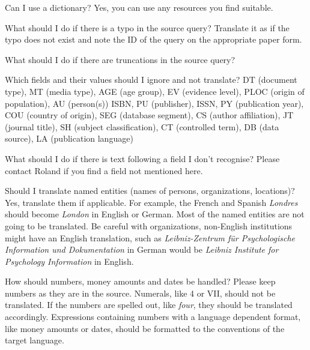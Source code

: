 \documentclass[a4paper,10pt]{article}
\newenvironment{faq}{\begin{description}[style=nextline]}{\end{description}}
\newcommand{\cris}[1]{{\color{red}{#1}}}
\begin{document}
\begin{faq}

  \item[Can I use a dictionary?]
 Yes, you can use any resources you find suitable.
  
  \item[What should I do if there is a typo in the source query?]
    Translate it as if the typo does not exist and note the ID of the query on the appropriate paper form.

  \item[What should I do if there are truncations in the source query?]
\cris{RR: No idea. Report it, so we can deal with this later?!}

    
  \item[Which fields and their values should I ignore and not translate?]
  DT (document type), MT (media type), AGE (age group), EV (evidence level), PLOC (origin of population), AU (person(s))
  ISBN, PU (publisher), ISSN, PY (publication year), COU (country of origin), SEG (database segment), CS (author affiliation), JT (journal title), SH (subject classification), CT (controlled term), DB (data source), LA (publication language)
  
  \item[What should I do if there is text following a field I don't recognise?]
    Please contact Roland if you find a field not mentioned here.
    
  \item[Should I translate named entities (names of persons, organizations, locations)?]
Yes, translate them if applicable. For example, the French and Spanish \textit{Londres} should become \textit{London} in English or German. Most of the named entities are not going to be translated. Be careful with organizations, non-English institutions might have an English translation, such as \textit{Leibniz-Zentrum f\"ur Psychologische Information und Dokumentation} in German would be \textit{Leibniz Institute for Psychology Information} in English. 

\item[How should numbers, money amounts and dates be handled?]
Please keep numbers as they are in the source. Numerals, like 4 or VII, should not be translated. If the numbers are spelled out, like \emph{four}, they should be translated accordingly. Expressions containing numbers with a language dependent format, like money amounts or dates, should be formatted to the conventions of the target language.
    
\end{faq}
\end{document}
